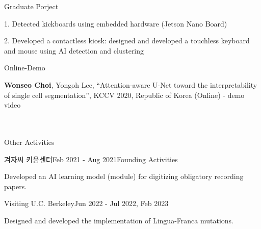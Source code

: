 \documentclass[
	11pt, %
]{resume} %
\begin{document}
\begin{rSection}{Graduate Porject}
	
	1. Detected kickboards using embedded hardware (Jetson Nano Board)

	2. Developed a contactless kiosk: designed and developed a touchless keyboard and mouse using AI detection and clustering

\end{rSection}

\begin{rSection}{Online-Demo}
	
	\textbf{Wonseo Choi}, Yongoh Lee, “Attention-aware U-Net toward the interpretability of single cell segmentation”, KCCV 2020, Republic of Korea (Online) - demo video
	\\
	\\
	\\
\end{rSection}

	



\begin{rSection}{Other Activities}

	\begin{rSubsection}{겨자씨 키움센터}{Feb 2021 - Aug 2021}{Founding Activities}{}
		\item Developed an AI learning model (module) for digitizing obligatory recording papers.
	\end{rSubsection}

	\begin{rSubsection}{Visiting U.C. Berkeley}{Jun 2022 - Jul 2022, Feb 2023}{}{}
		\item Designed and developed the implementation of Lingua-Franca mutations.
	\end{rSubsection}

\end{rSection}
\end{document}
